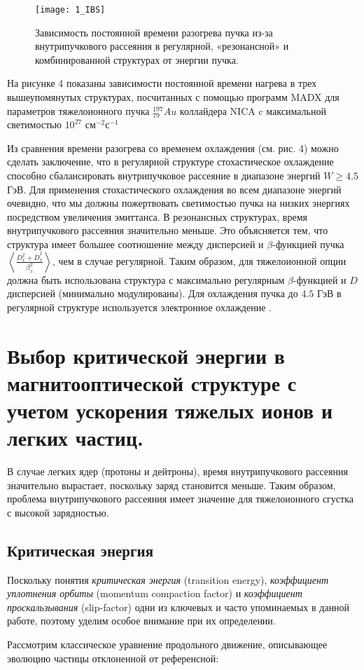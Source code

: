 \begin{figure}[!h]
  \centering
   \texttt{[image: 1\_IBS]}
   \caption{Зависимость постоянной времени разогрева пучка из-за внутрипучкового рассеяния в регулярной, «резонансной» и комбинированной структурах от энергии пучка.}
   \label{fig:1_IBS}
\end{figure}

\noindent На рисунке 4 показаны зависимости постоянной времени нагрева в трех вышеупомянутых структурах, посчитанных с помощью программ MADX \cite{madx, antoniou:ibs} для параметров тяжелоионного пучка ${_{79}^{197}}Au$ коллайдера NICA c максимальной светимостью ${10}^{27}$ см$^{-2}$с$^{-1}$

\noindent Из сравнения времени разогрева со временем охлаждения (см. рис. 4) можно сделать заключение, что в регулярной структуре стохастическое охлаждение способно сбалансировать внутрипучковое рассеяние в диапазоне энергий $W\geq4.5$ ГэВ. Для применения стохастического охлаждения во всем диапазоне энергий очевидно, что мы должны пожертвовать светимостью пучка на низких энергиях посредством увеличения эмиттанса. В резонансных структурах, время внутрипучкового рассеяния значительно меньше. Это объясняется тем, что структура имеет большее соотношение между дисперсией и $\beta$-функцией пучка $\left\langle\frac{D_x^2+{\dot{D}}_x^2}{\beta_x^2}\right\rangle$, чем в случае регулярной. Таким образом, для тяжелоионной опции должна быть использована структура с максимально регулярным $\beta$-функцией и $D$ дисперсией (минимально модулированы). Для охлаждения пучка до $4.5$ ГэВ в регулярной структуре используется электронное охлаждение \cite{kostromin:stochastic}.

\section{Выбор критической энергии в магнитооптической структуре с учетом ускорения тяжелых ионов и легких частиц.}\label{sec:ch:ions_light/transition}

\par В случае легких ядер (протоны и дейтроны), время внутрипучкового рассеяния значительно вырастает, поскольку заряд становится меньше. Таким образом, проблема внутрипучкового рассеяния имеет значение для тяжелоионного сгустка с высокой зарядностью.

\subsection{Критическая энергия}\label{sec:ch:ions_light/transition/energy}
\par Поскольку понятия \textit{критическая энергия} (transition energy), \textit{коэффициент уплотнения орбиты} (momentum compaction factor) и \textit{коэффициент проскальзывания} (slip-factor) одни из ключевых и часто упоминаемых  в данной работе, поэтому уделим особое внимание при их определении.
\par Рассмотрим классическое уравнение продольного движение, описывающее эволюцию частицы отклоненной от референсной:

